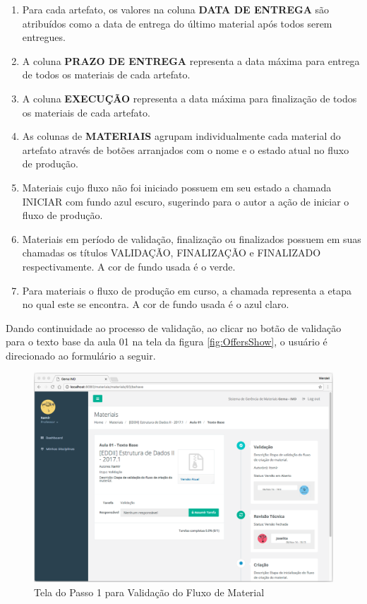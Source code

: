 \begin{enumerate}
	\item Para cada artefato, os valores na coluna \textbf{DATA DE ENTREGA} são atribuídos como a data de entrega do último material após todos serem entregues.
	\item A coluna \textbf{PRAZO DE ENTREGA} representa a data máxima para entrega de todos os materiais de cada artefato.
	\item A coluna \textbf{EXECUÇÃO} representa a data máxima para finalização de todos os materiais de cada artefato.
	\item As colunas de \textbf{MATERIAIS} agrupam individualmente cada material do artefato através de botões arranjados com o nome e o estado atual no fluxo de produção.
	\item Materiais cujo fluxo não foi iniciado possuem em seu estado a chamada INICIAR com fundo azul escuro, sugerindo para o autor a ação de iniciar o fluxo de produção.
	\item Materiais em período de validação, finalização ou finalizados possuem em suas chamadas os títulos VALIDAÇÃO, FINALIZAÇÃO e FINALIZADO respectivamente. A cor de fundo usada é o verde.
	\item Para materiais o fluxo de produção em curso, a chamada representa a etapa no qual este se encontra. A cor de fundo usada é o azul claro.
\end{enumerate}

Dando continuidade ao processo de validação, ao clicar no botão de validação para o texto base da aula 01 na tela da figura \hyperref[fig:OffersShow]{\ref{fig:OffersShow}}, o usuário é direcionado ao formulário a seguir.

\begin{figure}[H]
\centering
     \includegraphics[width=1.0\textwidth]{Screens/EndFlow.png}
      \caption{Tela do Passo 1 para Validação do Fluxo de Material}
       \label{fig:endFlow}
\end{figure} 

